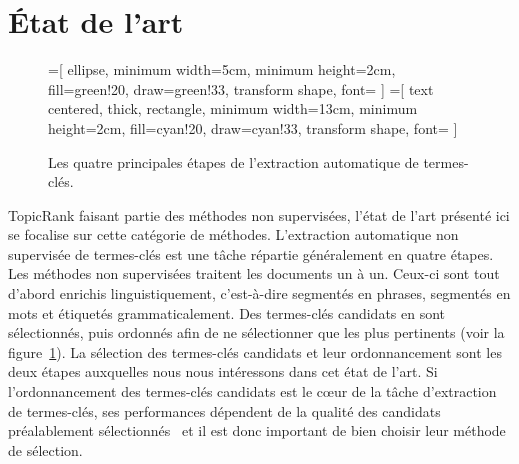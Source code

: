 \section{État de l'art}
\label{sec:etat_de_l_art}
  \begin{figure}
    =[
      ellipse,
      minimum width=5cm,
      minimum height=2cm,
      fill=green!20,
      draw=green!33,
      transform shape,
      font={\huge}
    ]
    =[
      text centered,
      thick,
      rectangle,
      minimum width=13cm,
      minimum height=2cm,
      fill=cyan!20,
      draw=cyan!33,
      transform shape,
      font={\huge\bfseries}
    ]

    \centering
    \caption{Les quatre principales étapes de l'extraction automatique de
             termes-clés. \label{fig:etapes_de_l_extraction_de_termes_cles}}
  \end{figure}
  TopicRank faisant partie des méthodes non supervisées, l'état de l'art
  présenté ici se focalise sur cette catégorie de méthodes. L'extraction
  automatique non supervisée de termes-clés est une tâche répartie généralement
  en quatre étapes. Les méthodes non supervisées traitent les documents un à un.
  Ceux-ci sont tout d'abord enrichis linguistiquement, c'est-à-dire segmentés en
  phrases, segmentés en mots  et étiquetés grammaticalement. Des termes-clés
  candidats en sont sélectionnés, puis ordonnés afin de ne sélectionner que les
  plus pertinents (voir la
  figure~\ref{fig:etapes_de_l_extraction_de_termes_cles}). La sélection des
  termes-clés candidats et leur ordonnancement sont les deux étapes auxquelles
  nous nous intéressons dans cet état de l'art. Si l'ordonnancement des
  termes-clés candidats est le c\oe{}ur de la tâche d'extraction de termes-clés,
  ses performances dépendent de la qualité des candidats préalablement
  sélectionnés~\cite{wang2014keyphraseextractionpreprocessing} et il est donc
  important de bien choisir leur méthode de sélection.

